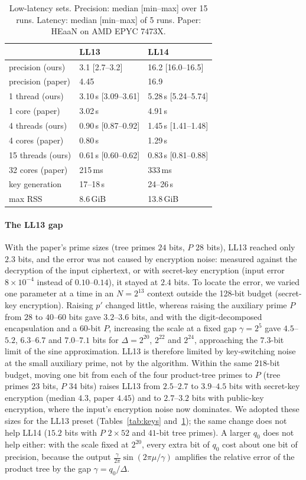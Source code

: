 \documentclass[sigconf,nonacm]{acmart}
\begin{document}
\begin{table}[t]
\caption{Low-latency sets. Precision: median [min--max] over 15 runs. Latency: median [min--max] of 5 runs. Paper: HEaaN on AMD EPYC 7473X.}
\label{tab:repro}
\small
\begin{tabular}{lll}
\toprule
 & LL13 & LL14 \\
\midrule
precision (ours) & 3.1 [2.7--3.2] & 16.2 [16.0--16.5] \\
precision (paper) & 4.45 & 16.9 \\
1 thread (ours) & 3.10\,s [3.09--3.61] & 5.28\,s [5.24--5.74] \\
1 core (paper) & 3.02\,s & 4.91\,s \\
4 threads (ours) & 0.90\,s [0.87--0.92] & 1.45\,s [1.41--1.48] \\
4 cores (paper) & 0.80\,s & 1.29\,s \\
15 threads (ours) & 0.61\,s [0.60--0.62] & 0.83\,s [0.81--0.88] \\
32 cores (paper) & 215\,ms & 333\,ms \\
key generation & 17--18\,s & 24--26\,s \\
max RSS & 8.6\,GiB & 13.8\,GiB \\
\bottomrule
\end{tabular}
\end{table}

\paragraph{The LL13 gap}
With the paper's prime sizes (tree primes $24$ bits, $P$ $28$ bits), LL13 reached only $2.3$ bits, and the error was not caused by encryption noise: measured against the decryption of the input ciphertext, or with secret-key encryption (input error $8\times10^{-4}$ instead of $0.10$--$0.14$), it stayed at $2.4$ bits.
To locate the error, we varied one parameter at a time in an $N=2^{13}$ context outside the 128-bit budget (secret-key encryption).
Raising $p'$ changed little, whereas raising the auxiliary prime $P$ from $28$ to $40$--$60$ bits gave $3.2$--$3.6$ bits, and with the digit-decomposed encapsulation and a $60$-bit $P$, increasing the scale at a fixed gap $\gamma=2^5$ gave $4.5$--$5.2$, $6.3$--$6.7$ and $7.0$--$7.1$ bits for $\Delta=2^{20}$, $2^{22}$ and $2^{24}$, approaching the $7.3$-bit limit of the sine approximation.
LL13 is therefore limited by key-switching noise at the small auxiliary prime, not by the algorithm.
Within the same $218$-bit budget, moving one bit from each of the four product-tree primes to $P$ (tree primes $23$ bits, $P$ $34$ bits) raises LL13 from $2.5$--$2.7$ to $3.9$--$4.5$ bits with secret-key encryption (median $4.3$, paper $4.45$) and to $2.7$--$3.2$ bits with public-key encryption, where the input's encryption noise now dominates.
We adopted these sizes for the LL13 preset (Tables~\ref{tab:keys} and~\ref{tab:repro}); the same change does not help LL14 ($15.2$ bits with $P$ $2\times 52$ and $41$-bit tree primes).
A larger $q_0$ does not help either: with the scale fixed at $2^{20}$, every extra bit of $q_0$ cost about one bit of precision, because the output $\frac{\gamma}{2\pi}\sin(2\pi\mu/\gamma)$ amplifies the relative error of the product tree by the gap $\gamma=q_0/\Delta$.
\end{document}
